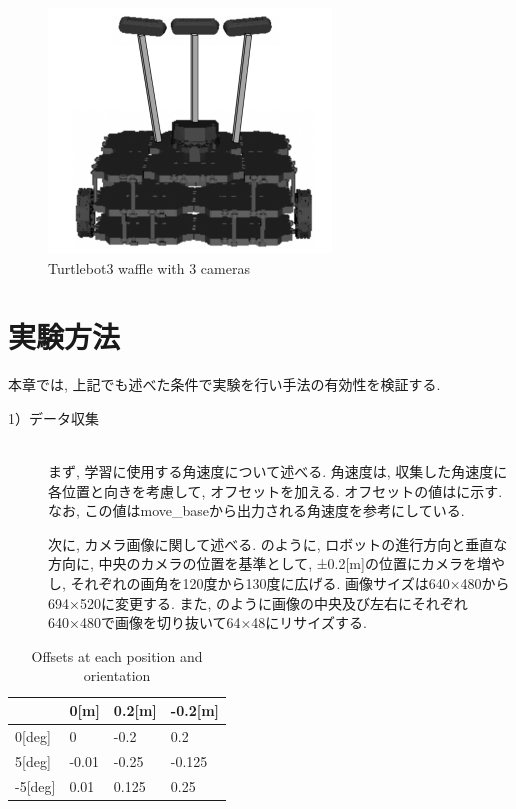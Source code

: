 \begin{figure}[h]
  \centering
  \includegraphics[keepaspectratio, scale=0.5]{images/turtlebot3.png}
  \caption{Turtlebot3 waffle with 3 cameras}
  \label{Fig:turtlebot3_3cam}
\end{figure}

\section{実験方法}
本章では, 上記でも述べた条件で実験を行い手法の有効性を検証する. 

\begin{description}
  \item[1）データ収集]\mbox{}\\ \hspace*{3mm}まず, 学習に使用する角速度について述べる. 角速度は, 収集した角速度に各位置と向きを考慮して, オフセットを加える. オフセットの値はに示す. なお, この値はmove\_baseから出力される角速度を参考にしている. \par \hspace*{3mm}次に, カメラ画像に関して述べる. のように, ロボットの進行方向と垂直な方向に, 中央のカメラの位置を基準として, ±0.2[m]の位置にカメラを増やし, それぞれの画角を120度から130度に広げる. 画像サイズは640×480から694×520に変更する. また, のように画像の中央及び左右にそれぞれ640×480で画像を切り抜いて64×48にリサイズする. 
\end{description}

\begin{table}[h]
  \centering
  \caption{Offsets at each position and orientation}
  \begin{tabular}{|p{2cm}|p{2cm}|p{2cm}|p{2cm}|} \hline
      & 0[m] & 0.2[m] & -0.2[m] \\ \hline
    0[deg] & 0 & -0.2 & 0.2 \\ \hline
    5[deg] & -0.01 & -0.25 & -0.125 \\ \hline
    -5[deg] & 0.01 & 0.125 & 0.25 \\ \hline
  \end{tabular}
  \label{tb:offset}
\end{table}

